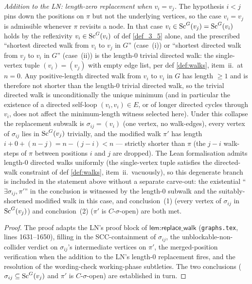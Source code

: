\begin{Lem}[LabelRoman]
    \emph{Addition to the LN: length-zero replacement when $v_i = v_j$.}
    The hypothesis $i < j$ pins down the positions on $\pi$ but not the underlying vertices, so the case $v_i = v_j$ is admissible whenever $\pi$ revisits a node. In that case $v_i \in \mathrm{Sc}^G(v_j) = \mathrm{Sc}^G(v_i)$ holds by the reflexivity $v_i \in \mathrm{Sc}^G(v_i)$ of def \ref{def_3_5} alone, and the prescribed ``shortest directed walk from $v_i$ to $v_j$ in $G$'' (case~(i)) or ``shortest directed walk from $v_j$ to $v_i$ in $G$'' (case~(ii)) is the length-$0$ trivial directed walk: the single-vertex tuple $(v_i) = (v_j)$ with empty edge list, per def \ref{def:walks}, item~ii.\ at $n = 0$. Any positive-length directed walk from $v_i$ to $v_i$ in $G$ has length $\ge 1$ and is therefore not shorter than the length-$0$ trivial directed walk, so the trivial directed walk is unconditionally the unique minimum (and in particular the existence of a directed self-loop $(v_i, v_i) \in E$, or of longer directed cycles through $v_i$, does not affect the minimum-length witness selected here). Under this collapse the replacement subwalk is $\sigma_{ij} = (v_i)$ (one vertex, no walk-edges), every vertex of $\sigma_{ij}$ lies in $\mathrm{Sc}^G(v_j)$ trivially, and the modified walk $\pi'$ has length $i + 0 + (n - j) = n - (j - i) < n$ — strictly shorter than $\pi$ (the $j - i$ walk-steps of $\pi$ between positions $i$ and $j$ are dropped). The Lean formalisation admits length-$0$ directed walks uniformly (the single-vertex tuple satisfies the directed-walk constraint of def \ref{def:walks}, item~ii.\ vacuously), so this degenerate branch is included in the statement above without a separate carve-out: the existential ``$\exists \sigma_{ij}, \pi'$'' in the conclusion is witnessed by the length-$0$ subwalk and the suitably-shortened modified walk in this case, and conclusion~(1) (every vertex of $\sigma_{ij}$ in $\mathrm{Sc}^G(v_j)$) and conclusion~(2) ($\pi'$ is $C$-$\sigma$-open) are both met.

\begin{proof}
The proof adapts the LN's proof block of $\textsf{lem:replace\_walk}$ (\texttt{graphs.tex}, lines 1631--1650), filling in the SCC-containment of $\sigma_{ij}$, the unblockable-non-collider verdict on $\sigma_{ij}$'s intermediate vertices on $\pi'$, the merged-position verification when the addition to the LN's length-$0$ replacement fires, and the resolution of the wording-check working-phase subtleties. The two conclusions ($\sigma_{ij} \subseteq \mathrm{Sc}^G(v_j)$ and $\pi'$ is $C$-$\sigma$-open) are established in turn.


\end{proof}
\end{Lem}
